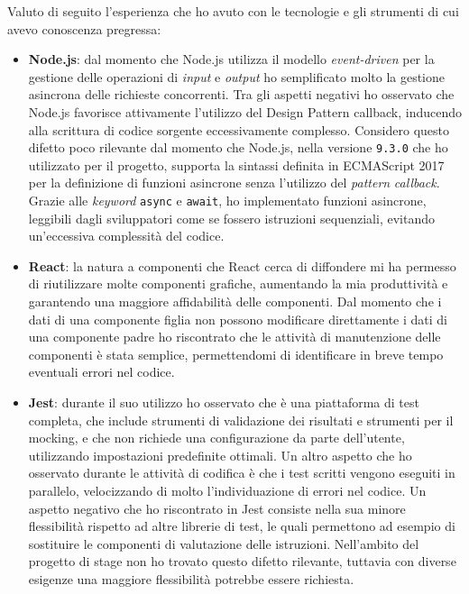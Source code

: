 Valuto di seguito l'esperienza che ho avuto con le tecnologie e gli strumenti di cui avevo conoscenza pregressa:
\begin{itemize}
  \item \textbf{Node.js}: dal momento che Node.js utilizza il modello \emph{event-driven} per la gestione delle operazioni di \emph{input} e \emph{output} ho semplificato molto la gestione asincrona delle richieste concorrenti. Tra gli aspetti negativi ho osservato che Node.js favorisce attivamente l'utilizzo del Design Pattern \gls{callback}, inducendo alla scrittura di codice sorgente eccessivamente complesso. Considero questo difetto poco rilevante dal momento che Node.js, nella versione \texttt{9.3.0} che ho utilizzato per il progetto, supporta la sintassi definita in ECMAScript 2017 per la definizione di funzioni asincrone senza l'utilizzo del \emph{pattern} \emph{callback}. Grazie alle \emph{keyword} \texttt{async} e \texttt{await}, ho implementato funzioni asincrone, leggibili dagli sviluppatori come se fossero istruzioni sequenziali, evitando un'eccessiva complessità del codice.
  \item \textbf{React}: la natura a componenti che React cerca di diffondere mi ha permesso di riutilizzare molte componenti grafiche, aumentando la mia  produttività e garantendo una maggiore affidabilità delle componenti. Dal momento che i dati di una componente figlia non possono modificare direttamente i dati di una componente padre ho riscontrato che le attività di manutenzione delle componenti è stata semplice, permettendomi di identificare in breve tempo eventuali errori nel codice.
  \item \textbf{Jest}: durante il suo utilizzo ho osservato che è una piattaforma di test completa, che include strumenti di validazione dei risultati e strumenti per il \gls{mocking}, e che non richiede una configurazione da parte dell'utente, utilizzando impostazioni predefinite ottimali. Un altro aspetto che ho osservato durante le attività di codifica è che i test scritti vengono eseguiti in parallelo, velocizzando di molto l'individuazione di errori nel codice. Un aspetto negativo che ho riscontrato in Jest consiste nella sua minore flessibilità rispetto ad altre librerie di test, le quali permettono ad esempio di sostituire le componenti di valutazione delle istruzioni. Nell'ambito del progetto di stage non ho trovato questo difetto rilevante, tuttavia con diverse esigenze una maggiore flessibilità potrebbe essere richiesta.

\end{itemize}
